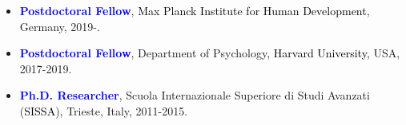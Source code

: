\documentclass[10pt]{article}
\begin{document}
	\header


	\begin{itemize}

    \itemsep-0.1em
	\item \textbf{\textcolor{blue}{Postdoctoral Fellow}}, \textcolor{black}{Max Planck Institute for Human Development}, Germany, 2019-.
	
	\item \textbf{\textcolor{blue}{Postdoctoral Fellow}}, Department of Psychology, \textcolor{black}{Harvard University}, USA, 2017-2019.
%	

	\item \textbf{\textcolor{blue}{Ph.D. Researcher}}, Scuola Internazionale Superiore di Studi Avanzati (\textcolor{black}{SISSA}), Trieste, Italy, 2011-2015.
%
%    
	\end{itemize}    
    
	
\end{document}
